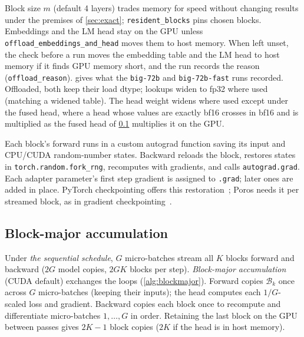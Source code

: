 \documentclass[11pt,letterpaper]{article}
\theoremstyle{definition}
\theoremstyle{plain}
\newcommand{\code}[1]{\texttt{\small #1}}
\newcommand{\G}{G}
\begin{document}
Block size $m$ (default 4 layers) trades memory for speed without changing results under the premises of \cref{sec:exact}; \code{resident\_blocks} pins chosen blocks.
Embeddings and the LM head stay on the GPU unless \code{offload\_embeddings\_and\_head} moves them to host memory.
When left unset, the check before a run moves the embedding table and the LM head to host memory if it finds GPU memory short, and the run records the reason (\code{offload\_reason}).
 gives what the \code{big-72b} and \code{big-72b-fast} runs recorded.
Offloaded, both keep their load dtype; lookups widen to fp32 where used (matching a widened table).
The head weight widens where used except under the fused head, where a head whose values are exactly bf16 crosses in bf16 and is multiplied as the fused head of \cref{sec:blockmajor} multiplies it on the GPU.

Each block's forward runs in a custom autograd function saving its input and CPU/CUDA random-number states. Backward reloads the block, restores states in \code{torch.random.fork\_rng}, recomputes with gradients, and calls \code{autograd.grad}. Each adapter parameter's first step gradient is assigned to \code{.grad}; later ones are added in place. PyTorch checkpointing offers this restoration~\cite{pytorch_checkpoint}; Poros needs it per streamed block, as in gradient checkpointing~\cite{chen2016training}.

\subsection{Block-major accumulation}\label{sec:blockmajor}

Under \emph{the sequential schedule}, $\G$ micro-batches stream all $K$ blocks forward and backward ($2\G$ model copies, $2\G K$ blocks per step). \emph{Block-major accumulation} (CUDA default) exchanges the loops (\cref{alg:blockmajor}). Forward copies $\mathcal{B}_k$ once across $\G$ micro-batches (keeping their inputs); the head computes each $1/\G$-scaled loss and gradient. Backward copies each block once to recompute and differentiate micro-batches $1,\dots,\G$ in order. Retaining the last block on the GPU between passes gives $2K-1$ block copies ($2K$ if the head is in host memory).
\end{document}
